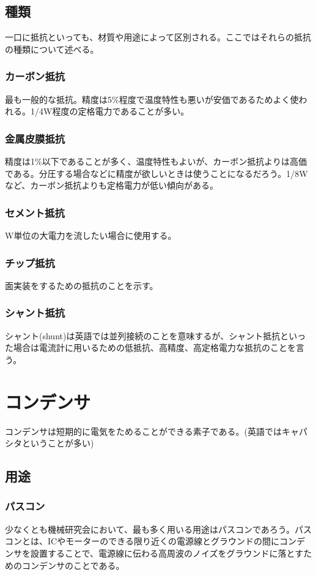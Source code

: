 \documentclass[a4paper,titlepage]{ujarticle}
\begin{document}
\subsection{種類}
一口に抵抗といっても、材質や用途によって区別される。ここではそれらの抵抗の種類について述べる。
\subsubsection{カーボン抵抗}
最も一般的な抵抗。精度は5\%程度で温度特性も悪いが安価であるためよく使われる。1/4W程度の定格電力であることが多い。
\subsubsection{金属皮膜抵抗}
精度は1\%以下であることが多く、温度特性もよいが、カーボン抵抗よりは高価である。分圧する場合などに精度が欲しいときは使うことになるだろう。1/8Wなど、カーボン抵抗よりも定格電力が低い傾向がある。
\subsubsection{セメント抵抗}
W単位の大電力を流したい場合に使用する。
\subsubsection{チップ抵抗}
面実装をするための抵抗のことを示す。
\subsubsection{シャント抵抗}
シャント(shunt)は英語では並列接続のことを意味するが、シャント抵抗といった場合は電流計に用いるための低抵抗、高精度、高定格電力な抵抗のことを言う。
\section{コンデンサ}
コンデンサは短期的に電気をためることができる素子である。(英語ではキャパシタということが多い)
\subsection{用途}
\subsubsection{パスコン}
少なくとも機械研究会において、最も多く用いる用途はパスコンであろう。パスコンとは、ICやモーターのできる限り近くの電源線とグラウンドの間にコンデンサを設置することで、電源線に伝わる高周波のノイズをグラウンドに落とすためのコンデンサのことである。
\end{document}
